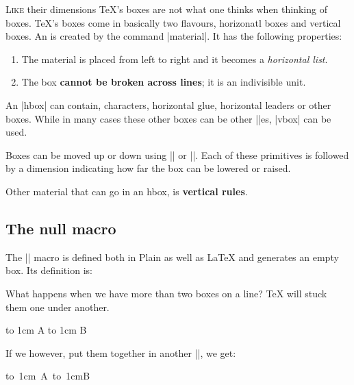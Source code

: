 \begin{multicols}{2}
\noindent \lettrine{L}{ike} their dimensions \TeX's boxes are not what one thinks when thinking of boxes. TeX's boxes come in basically two flavours, horizonatl boxes and vertical boxes. An  is created by the command |\hbox{material}|. It has the following properties:

\begin{enumerate}
\item The material is placed from left to right and it becomes a \textit{horizontal list}.
\item The box \textbf{cannot be broken across lines}; it is an indivisible unit.
\end{enumerate}

An |hbox| can contain, characters, horizontal glue, horizontal leaders or other boxes. While in many cases these other boxes can be other |\hbox|es, |vbox| can be used.

Boxes can be moved up or down using |\raise| or |\lower|. Each of these primitives is followed by a dimension indicating how far the box can be lowered or raised.

Other material that can go in an hbox, is \textbf{vertical rules}. 

\subsection{The null macro}

The |\null| macro is defined both in Plain as well as LaTeX and generates an empty box. Its definition is:

\begin{teXXX}
\def\null{\hbox{}}
\end{teXXX}



{


}

What happens when we have more than two boxes on a line? TeX will stuck them one under another.

\hbox to 1cm {A} \hbox to 1cm {B}

If we however, put them together in another |\hbox|, we get:

\hbox{\hbox to 1cm {A} \hbox to 1cm{B}}



\end{multicols}

